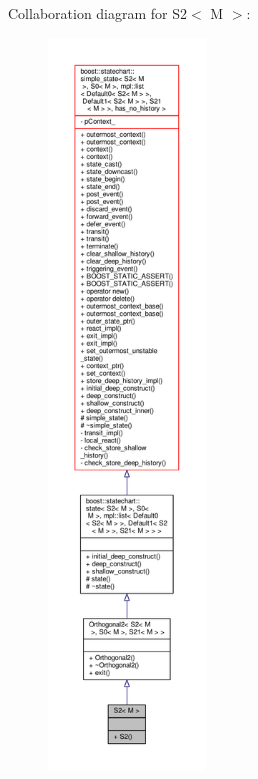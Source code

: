 Collaboration diagram for S2$<$ M $>$\+:
\nopagebreak
\begin{figure}[H]
\begin{center}
\leavevmode
\includegraphics[height=550pt]{struct_s2__coll__graph}
\end{center}
\end{figure}
